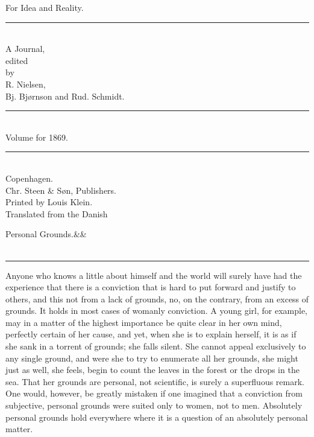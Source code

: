 \documentclass[12pt,a4paper,openany]{book}
\newcommand{\opage}[1]{\marginnote{\footnotesize\textit{[#1]}}}
\newcommand{\essayhead}[2]{\begin{center}{\large #1}\ifx&#2&\else\\[0.3em]{\normalsize #2}\fi\\[0.5em]\rule{3em}{0.4pt}\end{center}\medskip\noindent}
\begin{document}
\begin{titlepage}
\begin{center}
\vspace*{3em}
{\Huge For Idea and Reality.}\\[1em]
\rule{8em}{0.4pt}\\[1em]
{\large A Journal,}\\[0.8em]
{\small edited}\\[0.4em]
{\footnotesize by}\\[0.6em]
{\large R. Nielsen,}\\[0.4em]
{\large Bj. Bjørnson and Rud. Schmidt.}\\[1em]
\rule{8em}{0.4pt}\\[1em]
{\large Volume for 1869.}\\[1em]
\rule{8em}{0.4pt}\\[4em]
Copenhagen.\\[0.4em]
Chr. Steen \& Søn, Publishers.\\[1.5em]
{\small Printed by Louis Klein.}\\[3em]
{\small Translated from the Danish}
\end{center}
\end{titlepage}

\essayhead{Personal Grounds.}{}
\setcounter{footnote}{0}%
\opage{585}Anyone who knows a little about himself and the world
will surely have had the experience that there is a conviction
that is hard to put forward and justify
to others, and this not from a lack of grounds,
no, on the contrary, from an excess of grounds. It holds
in most cases of womanly conviction. A
young girl, for example, may in a matter of the highest importance
be quite clear in her own mind, perfectly
certain of her cause, and yet, when she is to explain herself, it
is as if she sank in a torrent of grounds; she falls silent.
She cannot appeal exclusively to any
single ground, and were she to try to enumerate all
her grounds, she might just as well, she feels,
begin to count the leaves in the forest or the drops
in the sea. That her grounds are personal, not
scientific, is surely a superfluous remark. One
would, however, be greatly mistaken if one imagined
that a conviction from subjective, personal grounds
were suited only to women, not to men. Absolutely
personal grounds hold everywhere where it is a question of
an absolutely personal matter.
\end{document}

